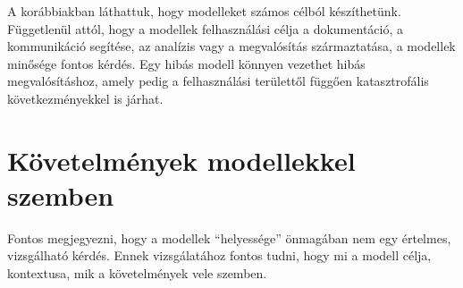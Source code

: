 \label{sec:modellek-ellenorzese}

\newcommand{\kiegeszitoanyag}{\textsuperscript{($\ast$)}}
\newcommand{\modellekEllenorzeseAllapotgepScale}{0.5}

A korábbiakban láthattuk, hogy modelleket számos célból készíthetünk. Függetlenül attól, hogy a modellek felhasználási célja a dokumentáció, a kommunikáció segítése, az analízis vagy a megvalósítás származtatása, a modellek minősége fontos kérdés. Egy hibás modell könnyen vezethet hibás megvalósításhoz, amely pedig a felhasználási területtől függően katasztrofális következményekkel is járhat.



\section{Követelmények modellekkel szemben}

Fontos megjegyezni, hogy a modellek ``helyessége'' önmagában nem egy értelmes, vizsgálható kérdés. Ennek vizsgálatához fontos tudni, hogy mi a modell célja, kontextusa, mik a követelmények vele szemben.

